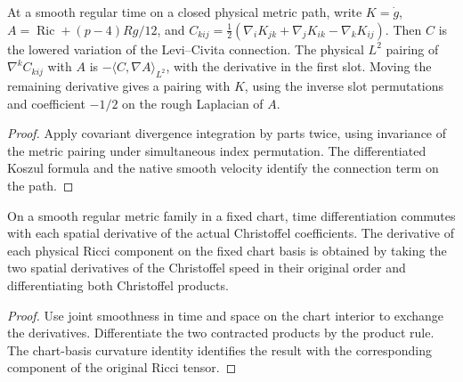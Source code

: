 \begin{proposition}
\label{prop:ed49-adjoint}
\leanok
At a smooth regular time on a closed physical metric path, write $K=\dot g$,
$A=\operatorname{Ric}+(p-4)Rg/12$, and
$C_{kij}=\tfrac12(\nabla_i K_{jk}+\nabla_j K_{ik}-\nabla_k K_{ij})$.
Then $C$ is the lowered variation of the Levi--Civita connection.
The physical $L^2$ pairing of $\nabla^k C_{kij}$ with $A$ is
$-\langle C,\nabla A\rangle_{L^2}$, with the derivative in the first slot.
Moving the remaining derivative gives a pairing with $K$, using the inverse
slot permutations and coefficient $-1/2$ on the rough Laplacian of $A$.
\end{proposition}
\begin{proof}
\leanok
Apply covariant divergence integration by parts twice, using invariance of the
metric pairing under simultaneous index permutation. The differentiated Koszul
formula and the native smooth velocity identify the connection term on the path.
\end{proof}

\begin{proposition}
\label{prop:ed49-ricci-time}
\leanok
On a smooth regular metric family in a fixed chart, time differentiation
commutes with each spatial derivative of the actual Christoffel coefficients.
The derivative of each physical Ricci component on the fixed chart basis
is obtained by taking the two spatial derivatives of the Christoffel speed
in their original order and differentiating both Christoffel products.
\end{proposition}
\begin{proof}
\leanok
Use joint smoothness in time and space on the chart interior to exchange
the derivatives. Differentiate the two contracted products by the product
rule. The chart-basis curvature identity identifies the result with the
corresponding component of the original Ricci tensor.
\end{proof}

